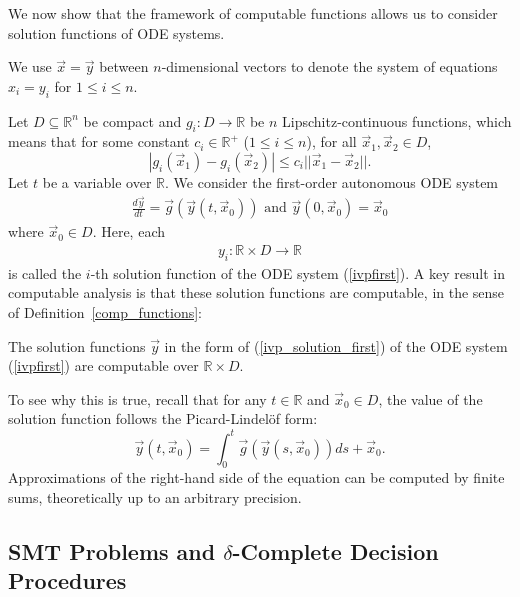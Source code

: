 \documentclass[11pt]{article}
\begin{document}
We now show that the framework of computable functions allows us to consider solution functions of ODE systems.
\begin{notation}
We use $\vec x= \vec y$ between $n$-dimensional vectors to denote the system of equations $x_i=y_i$ for $1\leq i\leq n$.
\end{notation}
Let $D\subseteq \mathbb{R}^n$ be compact and $g_i: D\rightarrow \mathbb{R}$ be $n$ Lipschitz-continuous functions, which means that for some constant $c_i\in \mathbb{R}^+$ ($1 \leq i \leq n$), for all
 $\vec x_1, \vec x_2\in D$,
$$|g_i(\vec x_1)-g_i(\vec x_2)|\leq c_i||\vec x_1-\vec x_2||.$$
Let $t$ be a variable over $\mathbb{R}$. We consider the first-order autonomous ODE system
\begin{eqnarray}\label{ivpfirst}
\frac{d \vec y}{dt} = \vec g(\vec y(t, \vec x_0)) \mbox{ and }\vec y(0, \vec x_0) = \vec x_0
\end{eqnarray}
where $\vec x_0\in D$. Here, each
\begin{eqnarray}\label{ivp_solution_first}
y_i: \mathbb{R}\times D\rightarrow \mathbb{R}
\end{eqnarray}
is called the $i$-th solution function of the ODE system (\ref{ivpfirst}). A key result in computable analysis is that these solution functions are computable, in the sense of Definition~\ref{comp_functions}: 
\begin{proposition}
The solution functions $\vec y$ in the form of (\ref{ivp_solution_first}) of the ODE system (\ref{ivpfirst}) are computable over $\mathbb{R}\times D$.
\end{proposition}
To see why this is true, recall that for any $t\in\mathbb{R}$ and $\vec x_0\in D$, the value of the solution function follows the Picard-Lindel\"of form:
$$\vec y(t,\vec x_0) = \int_{0}^t \vec g(\vec y(s,\vec x_0))ds + \vec x_0.$$
Approximations of the right-hand side of the equation can be computed by finite sums, theoretically up to an arbitrary precision.

\subsection{SMT Problems and $\delta$-Complete Decision Procedures}
\end{document}
